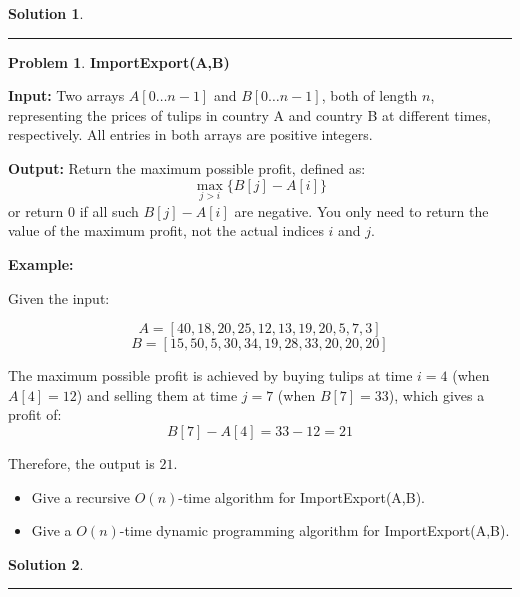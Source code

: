 \documentclass{article}
\theoremstyle{definition}
\newtheorem{problem}{Problem}
\def\fline{\rule{0.75\linewidth}{0.5pt}}
\newcommand{\finishline}{
  \begin{center}\fline
\end{center}}
\newtheorem*{solution*}{Solution}
\newenvironment{solution}{
\begin{solution*}}{{\finishline}
\end{solution*}}
\begin{document}
\begin{solution}




\end{solution}

\newpage

\begin{problem}
  \textbf{ImportExport(A,B)}

  \textbf{Input:} Two arrays \(A[0 \ldots n-1]\) and \(B[0 \ldots n-1]\), both of length \(n\), representing the prices of tulips in country A and country B at different times, respectively. All entries in both arrays are positive integers.

  \textbf{Output:} Return the maximum possible profit, defined as:
  \[
    \max _{j>i} \{ B[j] - A[i] \}
  \]
  or return 0 if all such \( B[j] - A[i] \) are negative. You only need to return the value of the maximum profit, not the actual indices \(i\) and \(j\).

  \textbf{Example:}

  Given the input:

  \[
    A = [40, 18, 20, 25, 12, 13, 19, 20, 5, 7, 3]
  \]
  \[
    B = [15, 50, 5, 30, 34, 19, 28, 33, 20, 20, 20]
  \]

  The maximum possible profit is achieved by buying tulips at time \(i = 4\) (when \(A[4] = 12\)) and selling them at time \(j = 7\) (when \(B[7] = 33\)), which gives a profit of:
  \[
    B[7] - A[4] = 33 - 12 = 21
  \]

  Therefore, the output is \(21\).

  \begin{itemize}
    \item Give a recursive $O(n)$-time algorithm for ImportExport(A,B).

    \item Give a $O(n)$-time dynamic programming algorithm for ImportExport(A,B).
  \end{itemize}
\end{problem}

\begin{solution}




\end{solution}
\end{document}
